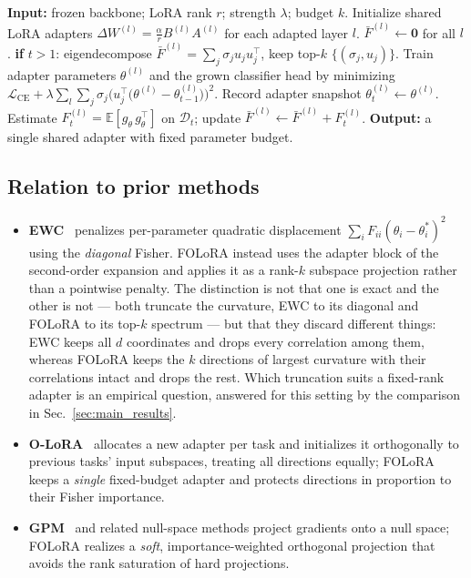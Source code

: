 \begin{algorithm}[t]
\caption{FOLoRA for class-incremental continual learning}
\label{alg:folora}
\begin{algorithmic}[1]
\STATE \textbf{Input:} frozen backbone; LoRA rank $r$; strength $\lambda$; budget $k$.
\STATE Initialize shared LoRA adapters $\Delta W^{(l)}=\frac{\alpha}{r}B^{(l)}A^{(l)}$ for each adapted layer $l$.
\STATE $\bar{F}^{(l)} \leftarrow \mathbf{0}$ for all $l$.
  \STATE \textbf{if} $t>1$: eigendecompose $\bar{F}^{(l)}=\sum_j\sigma_j u_j u_j^{\!\top}$,
         keep top-$k$ $\{(\sigma_j,u_j)\}$.
  \STATE Train adapter parameters $\theta^{(l)}$ and the grown classifier head by minimizing
         $\mathcal{L}_{\text{CE}}+\lambda\sum_{l}\sum_{j}\sigma_j\big(u_j^{\!\top}\big(\theta^{(l)}-\theta^{(l)}_{t-1}\big)\big)^2$.
  \STATE Record adapter snapshot $\theta^{(l)}_{t}\leftarrow\theta^{(l)}$.
  \STATE Estimate $F_t^{(l)}=\mathbb{E}[g_{\theta}\,g_{\theta}^{\!\top}]$ on $\mathcal{D}_t$; update
         $\bar{F}^{(l)}\leftarrow\bar{F}^{(l)}+F_t^{(l)}$.
\ENDFOR
\STATE \textbf{Output:} a single shared adapter with fixed parameter budget.
\end{algorithmic}
\end{algorithm}

\subsection{Relation to prior methods}
\label{sec:relation}
\begin{itemize}
\item \textbf{EWC}~\cite{kirkpatrick2017overcoming} penalizes per-parameter quadratic
displacement $\sum_i F_{ii}(\theta_i-\theta_i^*)^2$ using the \emph{diagonal} Fisher.
FOLoRA instead uses the adapter block of the second-order expansion and applies it as a
rank-$k$ subspace projection rather than a pointwise penalty. The distinction is not that
one is exact and the other is not --- both truncate the curvature, EWC to its diagonal and
FOLoRA to its top-$k$ spectrum --- but that they discard different things: EWC keeps all
$d$ coordinates and drops every correlation among them, whereas FOLoRA keeps the $k$
directions of largest curvature with their correlations intact and drops the rest. Which
truncation suits a fixed-rank adapter is an empirical question, answered for this setting
by the comparison in Sec.~\ref{sec:main_results}.
\item \textbf{O-LoRA}~\cite{wang2023olora} allocates a new adapter per task and
initializes it orthogonally to previous tasks' input subspaces, treating all directions
equally; FOLoRA keeps a \emph{single} fixed-budget adapter and protects directions in
proportion to their Fisher importance.
\item \textbf{GPM}~\cite{saha2021gradient} and related null-space methods project
gradients onto a null space; FOLoRA realizes a \emph{soft}, importance-weighted
orthogonal projection that avoids the rank saturation of hard projections.
\end{itemize}
